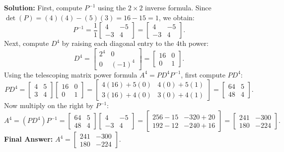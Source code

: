 \documentclass[11pt, letterpaper]{article}
\theoremstyle{definition}
\theoremstyle{remark}
\begin{document}
\textbf{Solution:}
First, compute $P^{-1}$ using the $2 \times 2$ inverse formula. Since $\det(P) = (4)(4) - (5)(3) = 16 - 15 = 1$, we obtain:
\[
P^{-1} = \frac{1}{1}\begin{bmatrix} 4 & -5 \\ -3 & 4 \end{bmatrix} = \begin{bmatrix} 4 & -5 \\ -3 & 4 \end{bmatrix}.
\]
Next, compute $D^{4}$ by raising each diagonal entry to the $4$th power:
\[
D^{4} = \begin{bmatrix} 2^{4} & 0 \\ 0 & (-1)^{4} \end{bmatrix} = \begin{bmatrix} 16 & 0 \\ 0 & 1 \end{bmatrix}.
\]
Using the telescoping matrix power formula $A^{4} = PD^{4}P^{-1}$, first compute $PD^{4}$:
\[
PD^{4} = \begin{bmatrix} 4 & 5 \\ 3 & 4 \end{bmatrix} \begin{bmatrix} 16 & 0 \\ 0 & 1 \end{bmatrix} = \begin{bmatrix} 4(16) + 5(0) & 4(0) + 5(1) \\ 3(16) + 4(0) & 3(0) + 4(1) \end{bmatrix} = \begin{bmatrix} 64 & 5 \\ 48 & 4 \end{bmatrix}.
\]
Now multiply on the right by $P^{-1}$:
\[
A^{4} = (PD^{4})P^{-1} = \begin{bmatrix} 64 & 5 \\ 48 & 4 \end{bmatrix} \begin{bmatrix} 4 & -5 \\ -3 & 4 \end{bmatrix} = \begin{bmatrix} 256 - 15 & -320 + 20 \\ 192 - 12 & -240 + 16 \end{bmatrix} = \begin{bmatrix} 241 & -300 \\ 180 & -224 \end{bmatrix}.
\]
\textbf{Final Answer:} $A^{4} = \begin{bmatrix} 241 & -300 \\ 180 & -224 \end{bmatrix}$.
\end{document}
